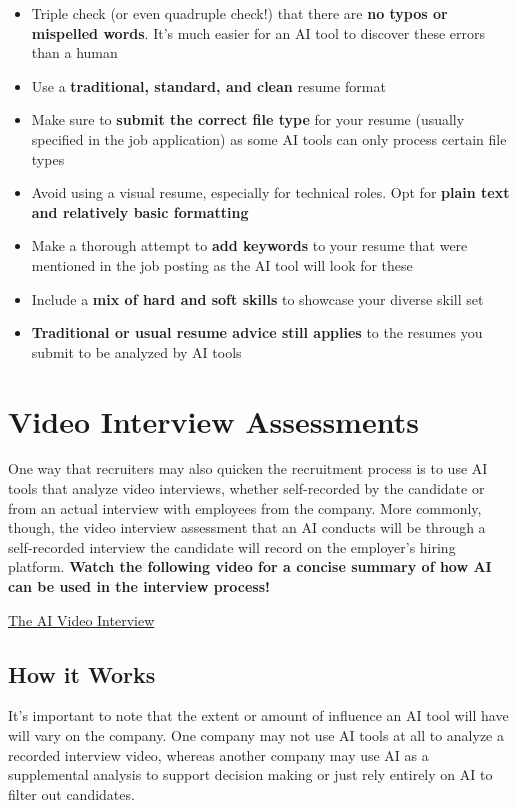 \documentclass[
]{book}
\begin{document}
\begin{itemize}
\item
  Triple check (or even quadruple check!) that there are \textbf{no typos or mispelled words}. It's much easier for an AI tool to discover these errors than a human
\item
  Use a \textbf{traditional, standard, and clean} resume format
\item
  Make sure to \textbf{submit the correct file type} for your resume (usually specified in the job application) as some AI tools can only process certain file types
\item
  Avoid using a visual resume, especially for technical roles. Opt for \textbf{plain text and relatively basic formatting}
\item
  Make a thorough attempt to \textbf{add keywords} to your resume that were mentioned in the job posting as the AI tool will look for these
\item
  Include a \textbf{mix of hard and soft skills} to showcase your diverse skill set
\item
  \textbf{Traditional or usual resume advice still applies} to the resumes you submit to be analyzed by AI tools
\end{itemize}

\hypertarget{video-interview-assessments}{%
\chapter{Video Interview Assessments}\label{video-interview-assessments}}

One way that recruiters may also quicken the recruitment process is to use AI tools that analyze video interviews, whether self-recorded by the candidate or from an actual interview with employees from the company. More commonly, though, the video interview assessment that an AI conducts will be through a self-recorded interview the candidate will record on the employer's hiring platform. \textbf{Watch the following video for a concise summary of how AI can be used in the interview process!}

\href{https://www.youtube.com/watch?v=cJkHft032OE}{The AI Video Interview}

\hypertarget{how-it-works}{%
\section{How it Works}\label{how-it-works}}

It's important to note that the extent or amount of influence an AI tool will have will vary on the company. One company may not use AI tools at all to analyze a recorded interview video, whereas another company may use AI as a supplemental analysis to support decision making or just rely entirely on AI to filter out candidates.
\end{document}
